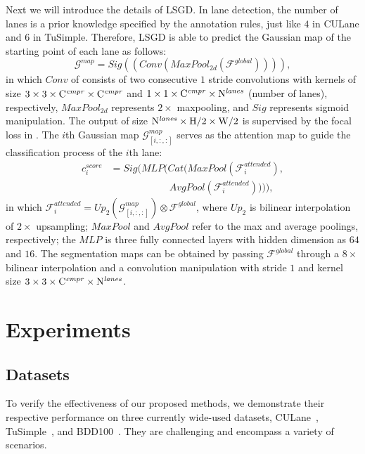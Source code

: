 \documentclass[preprint,12pt,review]{elsarticle}
\begin{document}
Next we will introduce the details of LSGD. In lane detection, the number of lanes is a prior knowledge specified by the annotation rules, just like $4$ in CULane and $6$ in TuSimple. Therefore, LSGD is able to predict the Gaussian map of the starting point of each lane as follows:
\begin{equation}
	\mathcal{G}^{map} = Sig((Conv(MaxPool_{2d}(\mathcal{F}^{global})))),
\end{equation}
in which $Conv$ of consists of two consecutive $1$ stride convolutions with kernels of size $3\times 3 \times \rm{C}^{\it{cmpr}} \times \rm{C}^{\it{cmpr}}$ and $1\times 1 \times \rm{C}^{\it{cmpr}} \times \rm{N}^{\it{lanes}}$ (number of lanes), respectively, ${MaxPool}_{2d}$ represents $2\times$ maxpooling, and $Sig$ represents sigmoid manipulation. The output of size $\rm N^{\it{lanes}}\times H/2 \times W/2$ is supervised by the focal loss in \cite{cornernet}. The $i$th Gaussian map $\mathcal{G}_{[i,:,:]}^{map}$ serves as the attention map to 
guide the classification process of the $i$th lane:
\begin{align}\label{attention}
	c^{score}_{i} &= Sig(MLP(Cat(MaxPool(\mathcal{F}^{attended}_{i}), \nonumber\\
	&\qquad \qquad \qquad  AvgPool(\mathcal{F}^{attended}_{i})))),
\end{align}
in which $\mathcal{F}^{attended}_{i} = Up_2(\mathcal{G}_{[i,:,:]}^{map}) \otimes \mathcal{F}^{global}$, where $Up_2$ is bilinear interpolation of $2\times$ upsampling; $MaxPool$ and $AvgPool$ refer to the max and average poolings, respectively; the $MLP$ is three fully connected layers with hidden dimension as $64$ and $16$. The segmentation maps can be obtained by passing $\mathcal{F}^{global}$ through a $8\times$ bilinear interpolation and a convolution manipulation with stride $1$ and kernel size $3\times 3 \times \rm{C}^{\it{cmpr}} \times \rm{N}^{\it{lanes}}$.

\section{Experiments}
\subsection{Datasets}
To verify the effectiveness of our proposed methods, we demonstrate their respective performance on three currently wide-used datasets, CULane~\cite{SCNN}, TuSimple~\cite{tusimple}, and BDD100~\cite{bdd}. They are challenging and encompass a variety of scenarios. 
\end{document}
